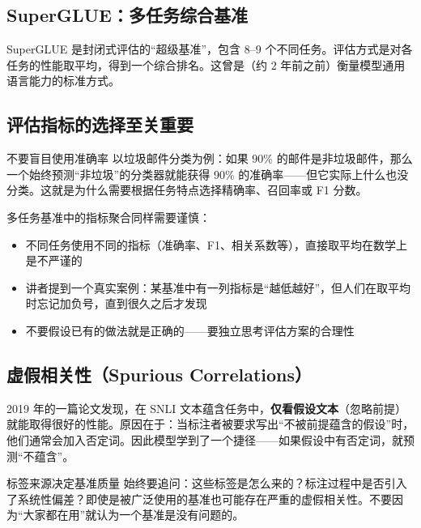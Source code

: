 \documentclass[a4paper]{article}
\begin{document}
\subsection{SuperGLUE：多任务综合基准}

SuperGLUE 是封闭式评估的``超级基准''，包含 8--9 个不同任务。评估方式是对各任务的性能取平均，得到一个综合排名。这曾是（约 2 年前之前）衡量模型通用语言能力的标准方式。





\subsection{评估指标的选择至关重要}

\begin{warningbox}{不要盲目使用准确率}
以垃圾邮件分类为例：如果 90\% 的邮件是非垃圾邮件，那么一个始终预测``非垃圾''的分类器就能获得 90\% 的准确率——但它实际上什么也没分类。这就是为什么需要根据任务特点选择精确率、召回率或 F1 分数。
\end{warningbox}

多任务基准中的指标聚合同样需要谨慎：

\begin{itemize}
    \item 不同任务使用不同的指标（准确率、F1、相关系数等），直接取平均在数学上是不严谨的
    \item 讲者提到一个真实案例：某基准中有一列指标是``越低越好''，但人们在取平均时忘记加负号，直到很久之后才发现
    \item 不要假设已有的做法就是正确的——要独立思考评估方案的合理性
\end{itemize}

\subsection{虚假相关性（Spurious Correlations）}





2019 年的一篇论文发现，在 SNLI 文本蕴含任务中，\textbf{仅看假设文本}（忽略前提）就能取得很好的性能。原因在于：当标注者被要求写出``不被前提蕴含的假设''时，他们通常会加入否定词。因此模型学到了一个捷径——如果假设中有否定词，就预测``不蕴含''。

\begin{warningbox}{标签来源决定基准质量}
始终要追问：这些标签是怎么来的？标注过程中是否引入了系统性偏差？即使是被广泛使用的基准也可能存在严重的虚假相关性。不要因为``大家都在用''就认为一个基准是没有问题的。
\end{warningbox}
\end{document}

